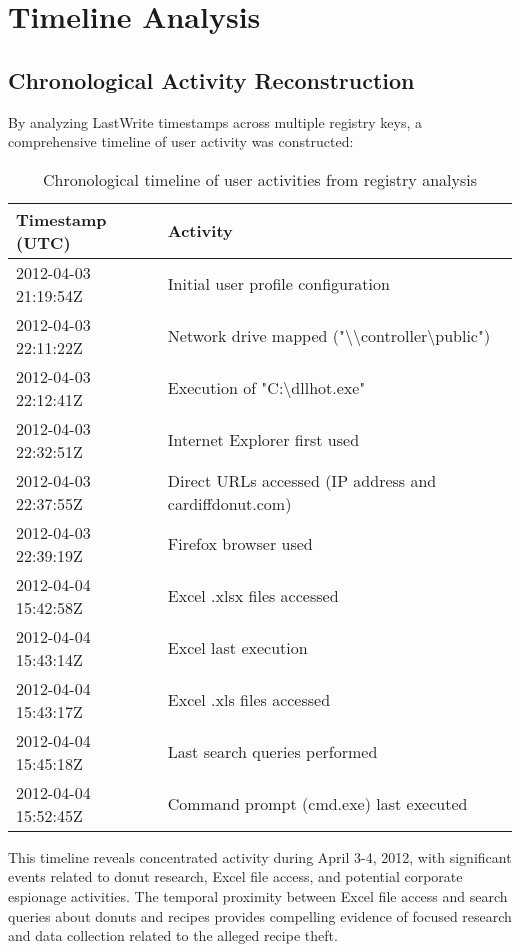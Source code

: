 \section{Timeline Analysis}
\subsection{Chronological Activity Reconstruction}
By analyzing LastWrite timestamps across multiple registry keys, a comprehensive timeline of user activity was constructed:

\begin{table}[htbp]
    \centering
    \begin{tabular}{|p{4cm}|p{9cm}|}
        \hline
        \textbf{Timestamp (UTC)} & \textbf{Activity} \\
        \hline
        2012-04-03 21:19:54Z & Initial user profile configuration \\
        \hline
        2012-04-03 22:11:22Z & Network drive mapped ("\textbackslash\textbackslash controller\textbackslash public") \\
        \hline
        2012-04-03 22:12:41Z & Execution of "C:\textbackslash dllhot.exe" \\
        \hline
        2012-04-03 22:32:51Z & Internet Explorer first used \\
        \hline
        2012-04-03 22:37:55Z & Direct URLs accessed (IP address and cardiffdonut.com) \\
        \hline
        2012-04-03 22:39:19Z & Firefox browser used \\
        \hline
        2012-04-04 15:42:58Z & Excel .xlsx files accessed \\
        \hline
        2012-04-04 15:43:14Z & Excel last execution \\
        \hline
        2012-04-04 15:43:17Z & Excel .xls files accessed \\
        \hline
        2012-04-04 15:45:18Z & Last search queries performed \\
        \hline
        2012-04-04 15:52:45Z & Command prompt (cmd.exe) last executed \\
        \hline
    \end{tabular}
    \caption{Chronological timeline of user activities from registry analysis}
    \label{tab:activity_timeline}
\end{table}

This timeline reveals concentrated activity during April 3-4, 2012, with significant events related to donut research, Excel file access, and potential corporate espionage activities. The temporal proximity between Excel file access and search queries about donuts and recipes provides compelling evidence of focused research and data collection related to the alleged recipe theft.

